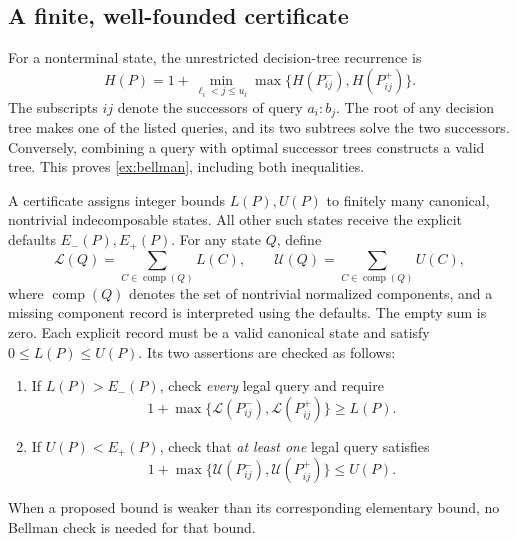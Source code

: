 \documentclass[11pt]{article}
\theoremstyle{definition}
\theoremstyle{remark}
\begin{document}
\subsection{A finite, well-founded certificate}

For a nonterminal state, the unrestricted decision-tree recurrence is
\begin{equation}\label{ex:bellman}
 H(P)=1+\min_{\ell_i<j\le u_i}
               \max\{H(P^-_{ij}),H(P^+_{ij})\}.
\end{equation}
The subscripts $ij$ denote the successors of query $a_i:b_j$. The root of any decision tree makes one of the listed queries, and its two
subtrees solve the two successors.  Conversely, combining a query with
optimal successor trees constructs a valid tree.  This proves
\eqref{ex:bellman}, including both inequalities.

A certificate assigns integer bounds $L(P),U(P)$ to finitely many canonical,
nontrivial indecomposable states.  All other such states receive the
explicit defaults $E_-(P),E_+(P)$.  For any state $Q$, define
\[
 \mathcal L(Q)=\sum_{C\in\operatorname{comp}(Q)}L(C),\qquad
 \mathcal U(Q)=\sum_{C\in\operatorname{comp}(Q)}U(C),
\]
where $\operatorname{comp}(Q)$ denotes the set of nontrivial normalized
components, and a missing component record is interpreted using the defaults.
The empty sum is zero.  Each explicit record must be a valid canonical state
and satisfy $0\le L(P)\le U(P)$.  Its two assertions are checked as follows:
\begin{enumerate}
 \item If $L(P)>E_-(P)$, check \emph{every} legal query and require
 \begin{equation}\label{ex:checklower}
  1+\max\{\mathcal L(P^-_{ij}),\mathcal L(P^+_{ij})\}\ge L(P).
 \end{equation}
 \item If $U(P)<E_+(P)$, check that \emph{at least one} legal query satisfies
 \begin{equation}\label{ex:checkupper}
  1+\max\{\mathcal U(P^-_{ij}),\mathcal U(P^+_{ij})\}\le U(P).
 \end{equation}
\end{enumerate}
When a proposed bound is weaker than its corresponding elementary bound,
no Bellman check is needed for that bound.
\end{document}
